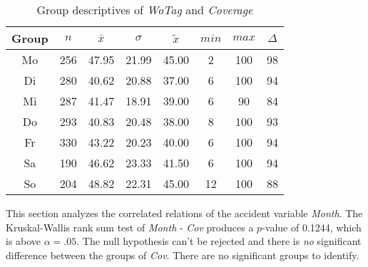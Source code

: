 \begin{table}[ht!]
	\tiny
	\centering
    \begin{tabular}{c|c|c|c|c|c|c|c}
        \toprule
        Group & $n$ & $\bar{x}$ & $\sigma$ & $\tilde{x}$ & $min$ & $max$ & $\Delta$ \\ 
        \midrule
        Mo & 256 & 47.95 & 21.99 & 45.00 & 2  & 100 & 98 \\ 
        Di & 280 & 40.62 & 20.88 & 37.00 & 6  & 100 & 94 \\ 
        Mi & 287 & 41.47 & 18.91 & 39.00 & 6  & 90  & 84 \\ 
        Do & 293 & 40.83 & 20.48 & 38.00 & 8  & 100 & 93 \\ 
        Fr & 330 & 43.22 & 20.23 & 40.00 & 6  & 100 & 94 \\ 
        Sa & 190 & 46.62 & 23.33 & 41.50 & 6  & 100 & 94 \\ 
        So & 204 & 48.82 & 22.31 & 45.00 & 12 & 100 & 88 \\ 
        \bottomrule
      \end{tabular}
	\caption{Group descriptives of \textit{WoTag} and \textit{Coverage}}
	\label{tbl:descriptives_baysis_matched_WoTag_Cov}
\end{table}

This section analyzes the correlated relations of the accident variable \textit{Month}. The Kruskal-Wallis rank sum test of \textit{Month} - \textit{Cov} produces a $p$-value of 0.1244, which is above $\alpha=.05$. The null hypothesis can't be rejected and there is \textit{no} significant difference between the groups of \textit{Cov}. There are no significant groups to identify.
